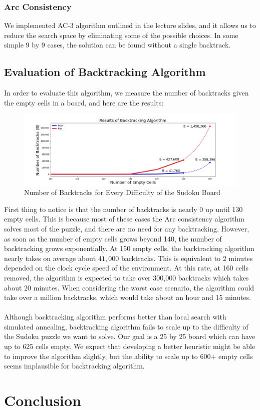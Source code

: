 \documentclass[12pt, a4paper]{article}
\begin{document}
			\subsubsection{Arc Consistency}
				We implemented AC-3 algorithm outlined in the lecture slides, and it allows us to reduce the search space by eliminating some of the possible choices. In some simple 9 by 9 cases, the solution can be found without a single backtrack.
		\subsection{Evaluation of Backtracking Algorithm}
			In order to evaluate this algorithm, we measure the number of backtracks given the empty cells in a board, and here are the results:
			\begin{figure}[h]
				\begin{center} 
					\includegraphics[width=7in]{backtrack.png}
					\caption{Number of Backtracks for Every Difficulty of the Sudoku Board} 
				\end{center} 
			\end{figure}
			First thing to notice is that the number of backtracks is nearly 0 up until 130 empty cells. This is because most of these cases the Arc consistency algorithm solves most of the puzzle, and there are no need for any backtracking. However, as soon as the number of empty cells grows beyond 140, the number of backtracking grows exponentially. At 150 empty cells, the backtracking algorithm nearly takes on average about $41,000$ backtracks. This is equivalent to 2 minutes depended on the clock cycle speed of the environment. At this rate, at 160 cells removed, the algorithm is expected to take over 300,000 backtracks which takes about 20 minutes. When considering the worst case scenario, the algorithm could take over a million backtracks, which would take about an hour and 15 minutes.\\\\
			Although backtracking algorithm performs better than local search with simulated annealing, backtracking algorithm fails to scale up to the difficulty of the Sudoku puzzle we want to solve. Our goal is a 25 by 25 board which can have up to 625 cells empty. We expect that developing a better heuristic might be able to improve the algorithm slightly, but the ability to scale up to 600+ empty cells seems implausible for backtracking algorithm.
	\section{Conclusion}
\end{document}
